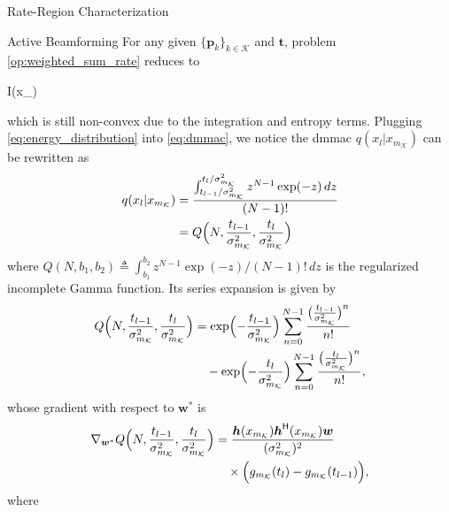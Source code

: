 \documentclass[journal]{IEEEtran}
\begin{document}
\begin{section}{Rate-Region Characterization}
	\begin{subsection}{Active Beamforming}
		For any given $\{\boldsymbol{p}_k\}_{k \in \mathcal{K}}$ and $\boldsymbol{t}$, problem \eqref{op:weighted_sum_rate} reduces to
		\begin{maxi!}
			{}{I(x_{})}{\label{op:active_beamforming}}{\label{ob:active_beamforming}}
			\addConstraint{\eqref{co:transmit_power},}
		\end{maxi!}
		which is still non-convex due to the integration and entropy terms.
		Plugging \eqref{eq:energy_distribution} into \eqref{eq:dmmac}, we notice the \gls{dmmac} $q(x_l|x_{m_{\mathcal{K}}})$ can be rewritten as
		\begin{align}
			q(x_l|x_{m_{\mathcal{K}}})
			 & = \frac{\int_{{t_{l-1}}/{\sigma_{m_{\mathcal{K}}}^2}}^{{t_l}/{\sigma_{m_{\mathcal{K}}}^2}} z^{N-1} \exp(-z) \, d z}{(N-1)!} \\
			 & = Q\Bigl(N,\frac{t_{l-1}}{\sigma_{m_{\mathcal{K}}}^2},\frac{t_l}{\sigma_{m_{\mathcal{K}}}^2}\Bigr)
		\end{align}
		where $Q(N, b_1, b_2) \triangleq \int_{b_1}^{b_2} z^{N-1} \exp(-z) / (N - 1)! \, d z$ is the regularized incomplete Gamma function.
		Its series expansion is given by \cite[Theorem 3]{Jameson2016}
		\begin{align}
			Q\Bigl(N,\frac{t_{l-1}}{\sigma_{m_{\mathcal{K}}}^2},\frac{t_l}{\sigma_{m_{\mathcal{K}}}^2}\Bigr)
			 & = \exp \Bigl(-\frac{t_{l-1}}{\sigma_{m_{\mathcal{K}}}^2}\Bigr) \sum_{n=0}^{N-1} \frac{\bigl(\frac{t_{l-1}}{\sigma_{m_{\mathcal{K}}}^2}\bigr)^n}{n!} \nonumber \\
			 & \quad - \exp \Bigl(-\frac{t_l}{\sigma_{m_{\mathcal{K}}}^2}\Bigr) \sum_{n=0}^{N-1} \frac{\bigl(\frac{t_l}{\sigma_{m_{\mathcal{K}}}^2}\bigr)^n}{n!},
			\label{eq:regularized_incomplete_gamma}
		\end{align}
		whose gradient with respect to $\boldsymbol{w}^*$ is
		\begin{align}
			\nabla_{\boldsymbol{w}^*} Q\Bigl(N,\frac{t_{l-1}}{\sigma_{m_{\mathcal{K}}}^2},\frac{t_l}{\sigma_{m_{\mathcal{K}}}^2}\Bigr)
			 & = \frac{\boldsymbol{h}(x_{m_{\mathcal{K}}})\boldsymbol{h}^\mathsf{H}(x_{m_{\mathcal{K}}})\boldsymbol{w}}{(\sigma_{m_{\mathcal{K}}}^2)^2} \nonumber \\
			 & \quad \times \Bigl(g_{m_{\mathcal{K}}}(t_l) - g_{m_{\mathcal{K}}}(t_{l-1})\Bigr),
			\label{eq:regularized_incomplete_gamma_gradient}
		\end{align}
		where
		\begin{equation}

\end{equation}
\end{subsection}
\end{section}
\end{document}
